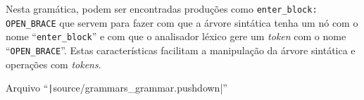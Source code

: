 Nesta gramática,
podem ser encontradas produções como \texttt{enter_block:
OPEN_BRACE} que servem para fazer com que a árvore sintática tenha um nó com o nome ``\texttt{enter_block}'' e
com que o analisador léxico gere um \textit{token} com o nome ``\texttt{OPEN_BRACE}''.
Estas características facilitam a manipulação da árvore sintática e
operações com \textit{tokens}.
\begin{code}
\caption[Arquivo ``source/grammars\_grammar.pushdown'']{Arquivo ``\texttt|source/grammars_grammar.pushdown|''}
\label{code:grammarsGrammarPushdown}
\inputminted[firstline=36,firstnumber=1]{antlr}{../source/grammars_grammar.pushdown}
\end{code}
